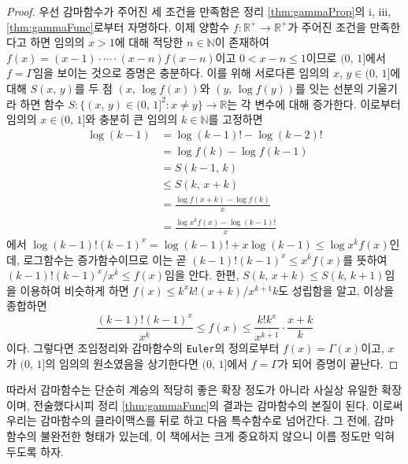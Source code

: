 \begin{proof}
    우선 감마함수가 주어진 세 조건을 만족함은 정리 \ref{thm:gammaProp}의 i, iii, \ref{thm:gammaFunc}로부터 자명하다. 이제 양함수 $f:\mathbb{R}^+\to\mathbb{R}^+$가 주어진 조건을 만족한다고 하면 임의의 $x>1$에 대해 적당한 $n\in\mathbb{N}$이 존재하여 $f(x)=(x-1)\cdot\cdots\cdot(x-n)f(x-n)$이고 $0<x-n\leq1$이므로 $(0,\,1]$에서 $f=\Gamma$임을 보이는 것으로 증명은 충분하다. 이를 위해 서로다른 임의의 $x,\,y\in(0,\,1]$에 대해 $S(x,\,y)$를 두 점 $(x,\,\log f(x))$와 $(y,\,\log f(y))$를 잇는 선분의 기울기라 하면 함수 $S:\{(x,\,y)\in(0,\,1]^2:x\ne y\}\to\mathbb{R}$는 각 변수에 대해 증가한다. 이로부터 임의의 $x\in(0,\,1]$와 충분히 큰 임의의 $k\in\mathbb{N}$를 고정하면
    \begin{align*}
        \log(k-1)&=\log(k-1)!-\log(k-2)!\\
        &=\log f(k)-\log f(k-1)\\
        &=S(k-1,\,k)\\
        &\leq S(k,\,x+k)\\
        &=\frac{\log f(x+k)-\log f(k)}{x}\\
        &=\frac{\log x^{\overline{k}}f(x)-\log(k-1)!}{x}
    \end{align*}
    에서 $\log(k-1)!(k-1)^x=\log(k-1)!+x\log(k-1)\leq\log x^{\overline{k}}f(x)$인데, 로그함수는 증가함수이므로 이는 곧 $(k-1)!(k-1)^x\leq x^{\overline{k}}f(x)$를 뜻하여 $(k-1)!(k-1)^x/x^{\overline{k}}\leq f(x)$임을 안다. 한편, $S(k,\,x+k)\leq S(k,\,k+1)$임을 이용하여 비슷하게 하면 $f(x)\leq k^xk!(x+k)/x^{\overline{k+1}}k$도 성립함을 알고, 이상을 종합하면
    \begin{equation*}
        \frac{(k-1)!(k-1)^x}{x^{\overline{k}}}\leq f(x)\leq\frac{k!k^x}{x^{\overline{k+1}}}\cdot\frac{x+k}{k}
    \end{equation*}
    이다. 그렇다면 조임정리와 감마함수의 \texttt{Euler}의 정의로부터 $f(x)=\Gamma(x)$이고, $x$가 $(0,\,1]$의 임의의 원소였음을 상기한다면 $(0,\,1]$에서 $f=\Gamma$가 되어 증명이 끝난다.
\end{proof}

따라서 감마함수는 단순히 계승의 적당히 좋은 확장 정도가 아니라 사실상 유일한 확장이며, 전술했다시피 정리 \ref{thm:gammaFunc}의 결과는 감마함수의 본질이 된다. 이로써 우리는 감마함수의 클라이맥스를 뒤로 하고 다음 특수함수로 넘어간다. 그 전에, 감마함수의 불완전한 형태가 있는데, 이 책에서는 크게 중요하지 않으니 이름 정도만 익혀두도록 하자.

